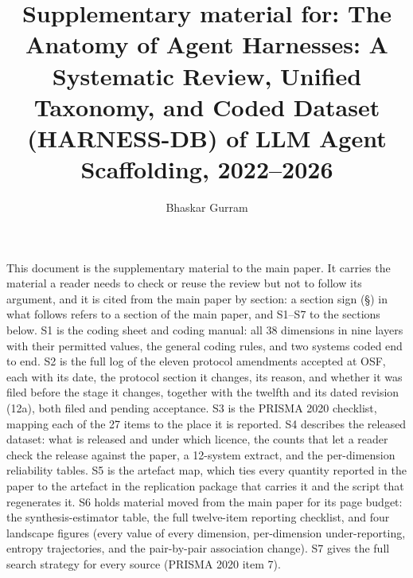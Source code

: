 \documentclass[manuscript,screen,review]{acmart}
\title[Supplementary material: The Anatomy of Agent Harnesses]{Supplementary material for: The Anatomy of Agent Harnesses: A Systematic Review, Unified Taxonomy, and Coded Dataset (HARNESS-DB) of LLM Agent Scaffolding, 2022--2026}
\author{Bhaskar Gurram}
\affiliation{%
  \institution{Independent researcher}
  \country{USA}}
\begin{document}
\maketitle

This document is the supplementary material to the main paper. It carries the material a reader
needs to check or reuse the review but not to follow its argument, and it is cited from the main
paper by section: a section sign (\S) in what follows refers to a section of the main paper, and
S1--S7 to the sections below.
S1 is the coding sheet and coding manual: all 38 dimensions in nine layers with their permitted values,
the general coding rules, and two systems coded end to end.
S2 is the full log of the eleven protocol amendments accepted at OSF, each with its date, the protocol
section it changes, its reason, and whether it was filed before the stage it changes, together with the
twelfth and its dated revision (12a), both filed and pending acceptance.
S3 is the PRISMA 2020 checklist, mapping each of the 27 items to the place it is reported.
S4 describes the released dataset: what is released and under which licence, the counts that let a
reader check the release against the paper, a 12-system extract, and the per-dimension reliability
tables.
S5 is the artefact map, which ties every quantity reported in the paper to the artefact in the
replication package that carries it and the script that regenerates it.
S6 holds material moved from the main paper for its page budget: the synthesis-estimator table, the
full twelve-item reporting checklist, and four landscape figures (every value of every dimension,
per-dimension under-reporting, entropy trajectories, and the pair-by-pair association change).
S7 gives the full search strategy for every source (PRISMA 2020 item 7).


\end{document}
